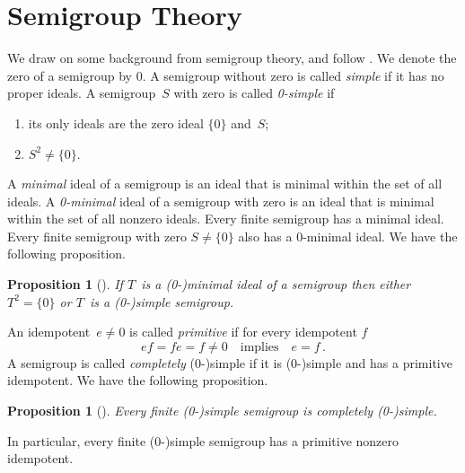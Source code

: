 \documentclass{lmcs}
\newtheorem{proposition}[thm]{Proposition}
\theoremstyle{definition}
\begin{document}



\appendix
\section{Semigroup Theory} \label{sec:background-semigroup}

We draw on some background from semigroup theory, and follow \cite{Howie1995}. We denote the zero of a semigroup by $0$.
A semigroup without zero is called \emph{simple} if it has no proper ideals.
A semigroup~$S$ with zero is called \emph{0-simple} if
\begin{enumerate}
\item[(i)] its only ideals are the zero ideal $\{0\}$ and~$S$;
\item[(ii)] $S^2 \ne \{0\}$.
\end{enumerate}

A \emph{minimal} ideal of a semigroup is an ideal that is minimal within the set of all ideals.
A \emph{0-minimal} ideal of a semigroup with zero is an ideal that is minimal within the set of all nonzero ideals.
Every finite semigroup has a minimal ideal.
Every finite semigroup with zero $S \ne \{0\}$ also has a 0-minimal ideal.
We have the following proposition.
\begin{proposition}[{\cite[Proposition~3.1.3]{Howie1995}}] \label{prop:3.1.3}
If $T$~is a \mbox{(0-)}minimal ideal of a semigroup then either $T^2 = \{0\}$ or $T$~is a \mbox{(0-)}simple semigroup.
\end{proposition}
An idempotent~$e \ne 0$ is called \emph{primitive} if for every idempotent $f$
\[
 e f  =  f e  =  f  \ne  0 \quad \text{implies} \quad e  =  f\,.
\]
A semigroup is called \emph{completely} \mbox{(0-)}simple if it is \mbox{(0-)}simple and has a primitive idempotent.
We have the following proposition.
\begin{proposition}[{\cite[Proposition~3.2.1]{Howie1995}}] \label{prop:3.2.1}
Every finite \mbox{(0-)}simple semigroup is completely \mbox{(0-)}simple.
\end{proposition}
In particular, every finite \mbox{(0-)}simple semigroup has a primitive nonzero idempotent.
\end{document}
